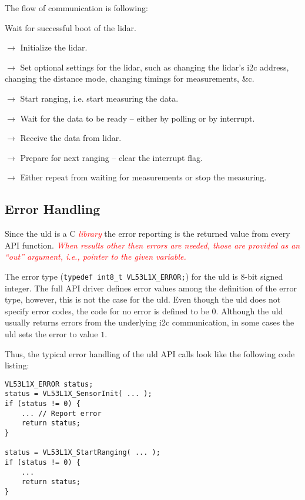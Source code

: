 \documentclass[
  digital,     %
  oneside,     %
  nosansbold,  %
  nocolorbold, %
  lof,         %
  lot,         %
]{fithesis4}
\newcommand{\TODO}[1]{\textcolor{red}{\textit{#1}}}
\begin{document}
The flow of communication is following:

Wait for successful boot of the \acrshort{lidar}.

$\rightarrow$ Initialize the \acrshort{lidar}.

$\rightarrow$ Set optional settings for the \acrshort{lidar}, such as changing the \acrshort{lidar}'s \acrshort{i2c} address, changing the distance mode, changing timings for measurements, \&c.

$\rightarrow$ Start ranging, i.e. start measuring the data.

$\rightarrow$ Wait for the data to be ready -- either by polling or by interrupt.

$\rightarrow$ Receive the data from \acrshort{lidar}.

$\rightarrow$ Prepare for next ranging -- clear the interrupt flag.

$\rightarrow$ Either repeat from waiting for measurements or stop the measuring.


\subsection{ Error Handling }

Since the \acrshort{uld} is a C \TODO{library} the error reporting is the returned value from every API function. \TODO{When results other then errors are needed, those are provided as an ``out'' argument, i.e., pointer to the given variable.}

The error type (\lstinline[breaklines=false]|typedef int8_t VL53L1X_ERROR;|) for the \acrshort{uld} is 8-bit signed integer. The full API driver defines error values among the definition of the error type, however, this is not the case for the \acrshort{uld}. Even though the \acrshort{uld} does not specify error codes, the code for no error is defined to be $0$. Although the \acrshort{uld} usually returns errors from the underlying \acrshort{i2c} communication, in some cases the \acrshort{uld} sets the error to value $1$.

Thus, the typical error handling of the \acrshort{uld} API calls look like the following code listing:

\begin{lstlisting}[float, caption={Structure of error handling of the \acrshort{uld} function calls.}, captionpos=b]
VL53L1X_ERROR status;
status = VL53L1X_SensorInit( ... );
if (status != 0) {
    ... // Report error
    return status;
}

status = VL53L1X_StartRanging( ... );
if (status != 0) {
    ...
    return status;
}
\end{lstlisting}
\end{document}
